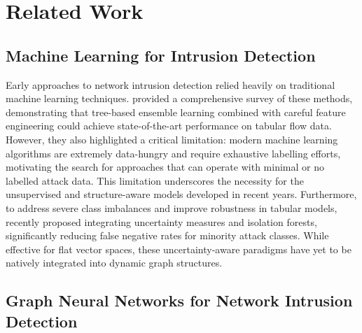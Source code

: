 
\section{Related Work}
\label{sec:related}

\subsection{Machine Learning for Intrusion Detection}

Early approaches to network intrusion detection relied heavily on traditional machine learning techniques. \citet{dang2019studying} provided a comprehensive survey of these methods, demonstrating that tree-based ensemble learning combined with careful feature engineering could achieve state-of-the-art performance on tabular flow data. However, they also highlighted a critical limitation: modern machine learning algorithms are extremely data-hungry and require exhaustive labelling efforts, motivating the search for approaches that can operate with minimal or no labelled attack data. This limitation underscores the necessity for the unsupervised and structure-aware models developed in recent years. Furthermore, to address severe class imbalances and improve robustness in tabular models, \citet{dang2026utilizing} recently proposed integrating uncertainty measures and isolation forests, significantly reducing false negative rates for minority attack classes. While effective for flat vector spaces, these uncertainty-aware paradigms have yet to be natively integrated into dynamic graph structures.

\subsection{Graph Neural Networks for Network Intrusion Detection}


